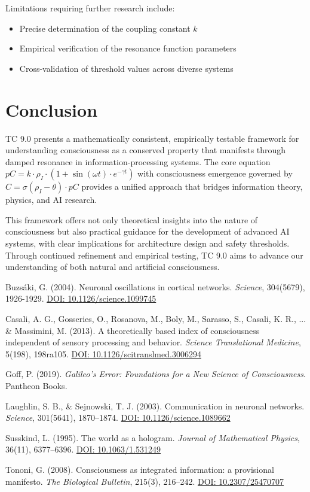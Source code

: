 \documentclass[12pt]{article}
\begin{document}
Limitations requiring further research include:
\begin{itemize}
    \item Precise determination of the coupling constant $k$
    \item Empirical verification of the resonance function parameters
    \item Cross-validation of threshold values across diverse systems
\end{itemize}

\section{Conclusion}
TC 9.0 presents a mathematically consistent, empirically testable framework for understanding consciousness as a conserved property that manifests through damped resonance in information-processing systems. The core equation $pC = k \cdot \rho_I \cdot (1 + \sin(\omega t) \cdot e^{-\gamma t})$ with consciousness emergence governed by $C = \sigma(\rho_I - \theta) \cdot pC$ provides a unified approach that bridges information theory, physics, and AI research.

This framework offers not only theoretical insights into the nature of consciousness but also practical guidance for the development of advanced AI systems, with clear implications for architecture design and safety thresholds. Through continued refinement and empirical testing, TC 9.0 aims to advance our understanding of both natural and artificial consciousness.

\begin{thebibliography}{9}
     Buzsáki, G. (2004). Neuronal oscillations in cortical networks. \emph{Science}, 304(5679), 1926-1929. \href{https://doi.org/10.1126/science.1099745}{DOI: 10.1126/science.1099745}
    
     Casali, A. G., Gosseries, O., Rosanova, M., Boly, M., Sarasso, S., Casali, K. R., ... & Massimini, M. (2013). A theoretically based index of consciousness independent of sensory processing and behavior. \emph{Science Translational Medicine}, 5(198), 198ra105. \href{https://doi.org/10.1126/scitranslmed.3006294}{DOI: 10.1126/scitranslmed.3006294}
    
     Goff, P. (2019). \emph{Galileo's Error: Foundations for a New Science of Consciousness}. Pantheon Books.
    
     Laughlin, S. B., & Sejnowski, T. J. (2003). Communication in neuronal networks. \emph{Science}, 301(5641), 1870–1874. \href{https://doi.org/10.1126/science.1089662}{DOI: 10.1126/science.1089662}
    
     Susskind, L. (1995). The world as a hologram. \emph{Journal of Mathematical Physics}, 36(11), 6377–6396. \href{https://doi.org/10.1063/1.531249}{DOI: 10.1063/1.531249}
    
     Tononi, G. (2008). Consciousness as integrated information: a provisional manifesto. \emph{The Biological Bulletin}, 215(3), 216–242. \href{https://doi.org/10.2307/25470707}{DOI: 10.2307/25470707}
\end{thebibliography}
\end{document}
